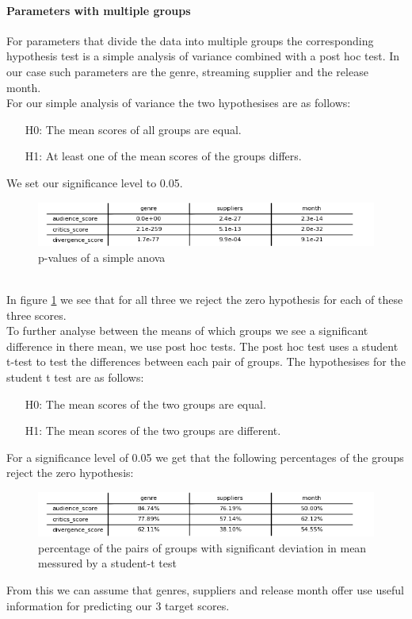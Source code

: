 \documentclass{article}
\begin{document}
    \paragraph{Parameters with multiple groups}
    For parameters that divide the data into multiple groups the corresponding hypothesis test is a simple analysis of variance combined with a post hoc test. In our case such parameters are the genre, streaming supplier and the release month.\\
    For our simple analysis of variance the two hypothesises are as follows:
    \begin{enumerate}
        \item[H0:] The mean scores of all groups are equal.
        \item[H1:] At least one of the mean scores of the groups differs.
    \end{enumerate}
    We set our significance level to 0.05.\\
    \noindent
    \begin{figure}[h]
        \centering
        \includegraphics[width=1\textwidth]{imgs/var_p.png}
        \caption{p-values of a simple anova}
        \label{fig:variance_p}
    \end{figure}\\
    In figure \ref{fig:variance_p} we see that for all three we reject the zero hypothesis for each of these three scores.\\
    To further analyse between the means of which groups we see a significant difference in there mean, we use post hoc tests. The post hoc test uses a student t-test to test the differences between each pair of groups. The hypothesises for the student t test are as follows:
    \begin{enumerate}
        \item[H0:] The mean scores of the two groups are equal.
        \item[H1:] The mean scores of the two groups are different.
    \end{enumerate}
    For a significance level of 0.05 we get that the following percentages of the groups reject the zero hypothesis:\\
    \noindent
    \begin{figure}[h]
        \centering
        \includegraphics[width=1\textwidth]{imgs/prozent.png}
        \caption{percentage of the pairs of groups with significant deviation in mean messured by a student-t test}
        \label{fig:hypo_rejection}
    \end{figure}
    \FloatBarrier
    From this we can assume that genres, suppliers and release month offer use useful information for predicting our 3 target scores.
\end{document}
